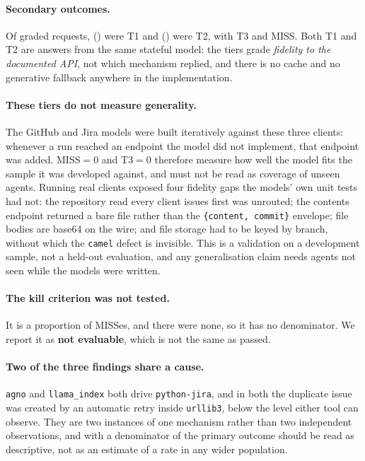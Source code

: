 \documentclass[11pt]{article}
\begin{document}


\paragraph{Secondary outcomes.} Of \BbRequests{} graded requests, \BbTOne{}
(\BbTOnePct{}) were T1 and \BbTTwo{} (\BbTTwoPct{}) were T2, with \BbTThree{} T3 and
\BbMiss{} MISS. Both T1 and T2 are answers from the same stateful model: the tiers grade
\emph{fidelity to the documented API}, not which mechanism replied, and there is no cache
and no generative fallback anywhere in the implementation.

\paragraph{These tiers do not measure generality.}
\label{sec:devorder}
The GitHub and Jira models were built iteratively against these three clients: whenever a
run reached an endpoint the model did not implement, that endpoint was added.
MISS${}=0$ and T3${}=0$ therefore measure how well the model fits the sample it was
developed against, and must not be read as coverage of unseen agents. Running real
clients exposed four fidelity gaps the models' own unit tests had not: the repository
read every client issues first was unrouted; the contents endpoint returned a bare file
rather than the \texttt{\{content, commit\}} envelope; file bodies are base64 on the
wire; and file storage had to be keyed by branch, without which the \texttt{camel} defect
is invisible. This is a validation on a development sample, not a held-out evaluation,
and any generalisation claim needs agents not seen while the models were written.

\paragraph{The kill criterion was not tested.} It is a proportion of MISSes, and there
were none, so it has no denominator. We report it as \textbf{not evaluable}, which is not
the same as passed.

\paragraph{Two of the three findings share a cause.} \texttt{agno} and
\texttt{llama\_index} both drive \texttt{python-jira}, and in both the duplicate issue
was created by an automatic retry inside \texttt{urllib3}, below the level either tool
can observe. They are two instances of one mechanism rather than two independent
observations, and with a denominator of \BbAgentsRun{} the primary outcome should be read
as descriptive, not as an estimate of a rate in any wider population.
\end{document}
